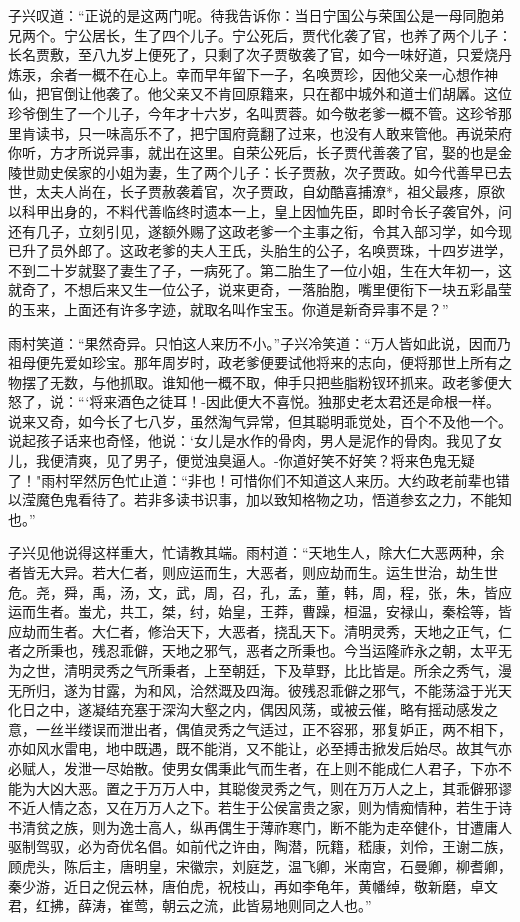 子兴叹道：“正说的是这两门呢。待我告诉你：当日宁国公与荣国公是一母同胞弟兄两个。宁公居长，生了四个儿子。宁公死后，贾代化袭了官，也养了两个儿子：长名贾敷，至八九岁上便死了，只剩了次子贾敬袭了官，如今一味好道，只爱烧丹炼汞，余者一概不在心上。幸而早年留下一子，名唤贾珍，因他父亲一心想作神仙，把官倒让他袭了。他父亲又不肯回原籍来，只在都中城外和道士们胡羼。这位珍爷倒生了一个儿子，今年才十六岁，名叫贾蓉。如今敬老爹一概不管。这珍爷那里肯读书，只一味高乐不了，把宁国府竟翻了过来，也没有人敢来管他。再说荣府你听，方才所说异事，就出在这里。自荣公死后，长子贾代善袭了官，娶的也是金陵世勋史侯家的小姐为妻，生了两个儿子：长子贾赦，次子贾政。如今代善早已去世，太夫人尚在，长子贾赦袭着官，次子贾政，自幼酷喜捕潦*，祖父最疼，原欲以科甲出身的，不料代善临终时遗本一上，皇上因恤先臣，即时令长子袭官外，问还有几子，立刻引见，遂额外赐了这政老爹一个主事之衔，令其入部习学，如今现已升了员外郎了。这政老爹的夫人王氏，头胎生的公子，名唤贾珠，十四岁进学，不到二十岁就娶了妻生了子，一病死了。第二胎生了一位小姐，生在大年初一，这就奇了，不想后来又生一位公子，说来更奇，一落胎胞，嘴里便衔下一块五彩晶莹的玉来，上面还有许多字迹，就取名叫作宝玉。你道是新奇异事不是？”

雨村笑道：“果然奇异。只怕这人来历不小。”子兴冷笑道：“万人皆如此说，因而乃祖母便先爱如珍宝。那年周岁时，政老爹便要试他将来的志向，便将那世上所有之物摆了无数，与他抓取。谁知他一概不取，伸手只把些脂粉钗环抓来。政老爹便大怒了，说：“`将来酒色之徒耳！-因此便大不喜悦。独那史老太君还是命根一样。说来又奇，如今长了七八岁，虽然淘气异常，但其聪明乖觉处，百个不及他一个。说起孩子话来也奇怪，他说：`女儿是水作的骨肉，男人是泥作的骨肉。我见了女儿，我便清爽，见了男子，便觉浊臭逼人。-你道好笑不好笑？将来色鬼无疑了！"雨村罕然厉色忙止道：“非也！可惜你们不知道这人来历。大约政老前辈也错以滢魔色鬼看待了。若非多读书识事，加以致知格物之功，悟道参玄之力，不能知也。”

子兴见他说得这样重大，忙请教其端。雨村道：“天地生人，除大仁大恶两种，余者皆无大异。若大仁者，则应运而生，大恶者，则应劫而生。运生世治，劫生世危。尧，舜，禹，汤，文，武，周，召，孔，孟，董，韩，周，程，张，朱，皆应运而生者。蚩尤，共工，桀，纣，始皇，王莽，曹躁，桓温，安禄山，秦桧等，皆应劫而生者。大仁者，修治天下，大恶者，挠乱天下。清明灵秀，天地之正气，仁者之所秉也，残忍乖僻，天地之邪气，恶者之所秉也。今当运隆祚永之朝，太平无为之世，清明灵秀之气所秉者，上至朝廷，下及草野，比比皆是。所余之秀气，漫无所归，遂为甘露，为和风，洽然溉及四海。彼残忍乖僻之邪气，不能荡溢于光天化日之中，遂凝结充塞于深沟大壑之内，偶因风荡，或被云催，略有摇动感发之意，一丝半缕误而泄出者，偶值灵秀之气适过，正不容邪，邪复妒正，两不相下，亦如风水雷电，地中既遇，既不能消，又不能让，必至搏击掀发后始尽。故其气亦必赋人，发泄一尽始散。使男女偶秉此气而生者，在上则不能成仁人君子，下亦不能为大凶大恶。置之于万万人中，其聪俊灵秀之气，则在万万人之上，其乖僻邪谬不近人情之态，又在万万人之下。若生于公侯富贵之家，则为情痴情种，若生于诗书清贫之族，则为逸士高人，纵再偶生于薄祚寒门，断不能为走卒健仆，甘遭庸人驱制驾驭，必为奇优名倡。如前代之许由，陶潜，阮籍，嵇康，刘伶，王谢二族，顾虎头，陈后主，唐明皇，宋徽宗，刘庭芝，温飞卿，米南宫，石曼卿，柳耆卿，秦少游，近日之倪云林，唐伯虎，祝枝山，再如李龟年，黄幡绰，敬新磨，卓文君，红拂，薛涛，崔莺，朝云之流，此皆易地则同之人也。”

